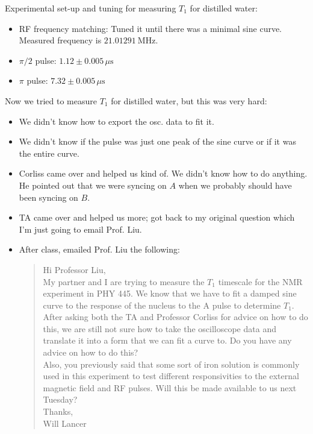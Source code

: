 \documentclass[11pt]{article}
\begin{document}
Experimental set-up and tuning for measuring $T_1$ for distilled water:

\begin{itemize}
    \item RF frequency matching: Tuned it until there was a minimal sine curve. Measured frequency is $21.01291~\mathrm{MHz}$.
    \item $\pi/2$ pulse: $1.12 \pm 0.005 \, \mu \mathrm{s}$
    \item $\pi$ pulse: $7.32 \pm 0.005 \, \mu \mathrm{s}$
\end{itemize}

Now we tried to measure $T_1$ for distilled water, but this was very hard:
\begin{itemize}
    \item We didn't know how to export the osc. data to fit it.
    \item We didn't know if the pulse was just one peak of the sine
    curve or if it was the entire curve.
    \item Corliss came over and helped us kind of. We didn't know how
    to do anything. He pointed out that we were syncing on $A$ when we
    probably should have been syncing on $B$.
    \item TA came over and helped us more; got back to my original
    question which I'm just going to email Prof. Liu.
    \item After class, emailed Prof. Liu the following:
    \begin{quote}
        Hi Professor Liu,\\

        My partner and I are trying to measure the $T_1$ timescale for the NMR
        experiment in PHY 445. We know that we have to fit a damped sine curve to the
        response of the nucleus to the A pulse to determine $T_1$. After asking both
        the TA and Professor Corliss for advice on how to do this, we are still not
        sure how to take the oscilloscope data and translate it into a form that we
        can fit a curve to. Do you have any advice on how to do this?\\

        Also, you previously said that some sort of iron solution is commonly used
        in this experiment to test different responsivities to the external magnetic
        field and RF pulses. Will this be made available to us next Tuesday?\\

        Thanks,\\
        Will Lancer
    \end{quote}
\end{itemize}
\end{document}
